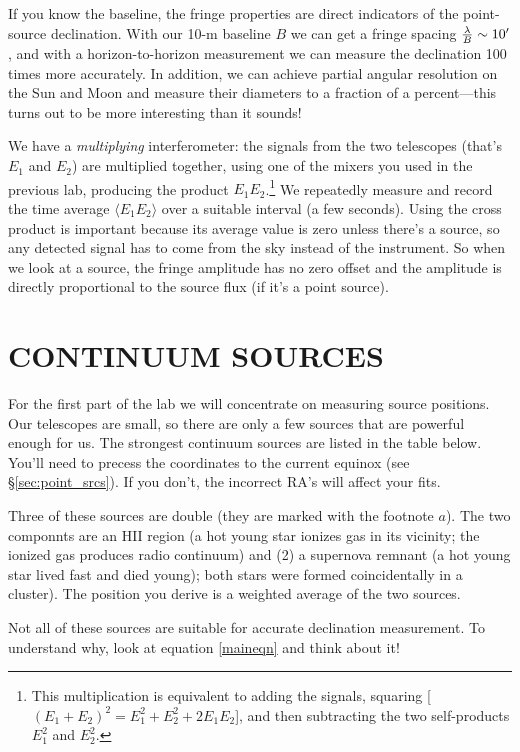 \documentclass[11pt,preprint]{aastex}
\begin{document}
 If you know the baseline, the fringe properties are direct indicators
of the point-source declination.  With our 10-m baseline $B$ we can get
a fringe spacing ${\lambda \over B}\sim 10'$, and with a
horizon-to-horizon measurement we can measure the declination 100 times
more accurately.  In addition, we can achieve partial angular resolution
on the Sun and Moon and measure their diameters to a fraction of a
percent---this turns out to be more interesting than it sounds!

We have a {\it multiplying} interferometer: the signals from the two
telescopes (that's $E_1$ and $E_2$) are multiplied together, using one
of the mixers you used in the previous lab, producing the product
$E_1E_2$.\footnote{This multiplication is equivalent to adding the
signals, squaring [$(E_1 + E_2)^2 = E_1^2 + E_2^2 + 2E_1E_2$], and then
subtracting the two self-products $E_1^2$ and $E_2^2$.} We repeatedly
measure and record the time average $\langle E_1E_2 \rangle$ over a
suitable interval (a few seconds). Using the cross product is important
because its average value is zero unless there's a source, so any
detected signal has to come from the sky instead of the instrument.  So
when we look at a source, the fringe amplitude has no zero offset and
the amplitude is directly proportional to the source flux (if it's a
point source).


\section {CONTINUUM SOURCES}

	For the first part of the lab we will concentrate on measuring
source positions. Our telescopes are small, so there are only a few
sources that are powerful enough for us. The strongest continuum sources
are listed in the table below.  
You'll need to precess the coordinates
to the current equinox (see \S\ref{sec:point_srcs}). If you don't, the incorrect RA's will affect
your fits. 

Three of these sources are double (they are marked with the footnote
$a$). The two componnts are an HII region (a hot young star ionizes gas
in its vicinity; the ionized gas produces radio continuum) and (2) a
supernova remnant (a hot young star lived fast and died young); both
stars were formed coincidentally in a cluster). The position you derive
is a weighted average of the two sources. 

Not all of these sources are suitable for accurate declination
measurement. To understand why, look at equation \ref {maineqn} and
think about it!
\end{document}
